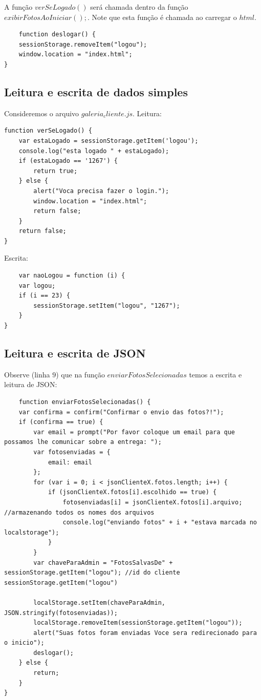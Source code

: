 	A função $verSeLogado()$ será chamada dentro da função $exibirFotosAoIniciar();$.
	Note que esta função é chamada ao carregar o $html$.
	
\begin{lstlisting}
	function deslogar() {
    sessionStorage.removeItem("logou");
    window.location = "index.html";
}
\end{lstlisting}
\subsection{Leitura e escrita de dados simples}
	Consideremos o arquivo $galeria_cliente.js$.
	Leitura:
\begin{lstlisting}	
function verSeLogado() {
    var estaLogado = sessionStorage.getItem('logou');
    console.log("esta logado " + estaLogado);
    if (estaLogado == '1267') {
        return true;
    } else {
        alert("Voca precisa fazer o login.");
        window.location = "index.html";
        return false;
    }
    return false;
}
\end{lstlisting}
	Escrita:
\begin{lstlisting}	
	var naoLogou = function (i) {
    var logou;
    if (i == 23) {
        sessionStorage.setItem("logou", "1267");
    }
}
\end{lstlisting}
\subsection{Leitura e escrita de JSON}
	Observe (linha $9$) que na função $enviarFotosSelecionadas$ temos a escrita e leitura de JSON:
	
		\begin{lstlisting}	
	function enviarFotosSelecionadas() {
    var confirma = confirm("Confirmar o envio das fotos?!");
    if (confirma == true) {
        var email = prompt("Por favor coloque um email para que possamos lhe comunicar sobre a entrega: ");
        var fotosenviadas = { 
            email: email
        };
        for (var i = 0; i < jsonClienteX.fotos.length; i++) {
            if (jsonClienteX.fotos[i].escolhido == true) {
                fotosenviadas[i] = jsonClienteX.fotos[i].arquivo; //armazenando todos os nomes dos arquivos
                console.log("enviando fotos" + i + "estava marcada no localstorage");
            }
        }
        var chaveParaAdmin = "FotosSalvasDe" + sessionStorage.getItem("logou"); //id do cliente sessionStorage.getItem("logou")
        
        localStorage.setItem(chaveParaAdmin, JSON.stringify(fotosenviadas));
        localStorage.removeItem(sessionStorage.getItem("logou"));
        alert("Suas fotos foram enviadas Voce sera redirecionado para o inicio");
        deslogar();
    } else {
        return;
    }
}	
		\end{lstlisting}
